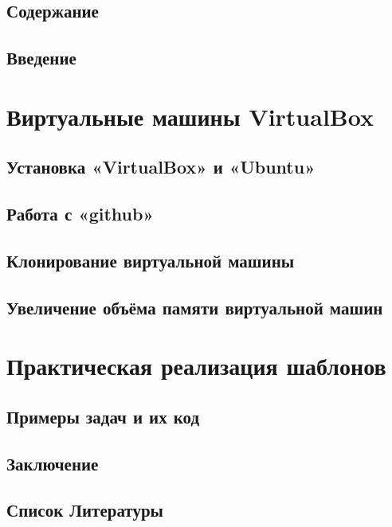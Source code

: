 \documentclass[oneside,final,14pt]{extarticle} %
\begin{document}


\setcounter{page}{2}

\section*{Содержание}
\setlength{\parindent}{0cm}

\newpage

\setlength{\parindent}{1.25cm}

\section*{Введение}

\newpage

\chapter{Виртуальные машины VirtualBox}
\section{Установка «VirtualBox» и «Ubuntu»}



\newpage
\section{Работа с «github»}

\newpage

\section{Клонирование виртуальной машины}

\newpage

\section{Увеличение объёма памяти виртуальной машин}

\newpage

\chapter{Практическая реализация шаблонов}
\section*{Примеры задач и их код}

\newpage


\section*{Заключение}

\newpage

\section*{Список Литературы}
\setlength{\parindent}{0cm}

\newpage

\appendix
\end{document}
